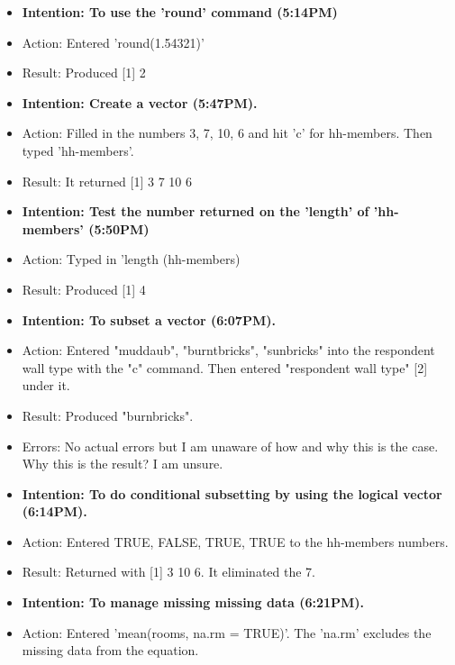 \documentclass[a4paper,12pt]{article}
\begin{document}
\begin{itemize}
\item \textbf{Intention: To use the 'round' command (5:14PM)}


\item Action: Entered 'round(1.54321)'


\item Result: Produced [1] 2


\item \textbf{Intention: Create a vector (5:47PM).}


\item Action: Filled in the numbers 3, 7, 10, 6 and hit 'c' for hh-members. Then typed 'hh-members'.


\item Result: It returned [1] 3 7 10 6


\item \textbf{Intention: Test the number returned on the 'length' of 'hh-members' (5:50PM)}


\item Action: Typed in 'length (hh-members)


\item Result: Produced [1] 4


\item \textbf{Intention: To subset a vector (6:07PM).}


\item Action: Entered "muddaub", "burntbricks", "sunbricks" into the respondent wall type with the "c" command. Then entered "respondent wall type" [2] under it.


\item Result: Produced "burnbricks". 

\item Errors: No actual errors but I am unaware of how and why this is the case. Why this is the result? I am unsure.  


\item \textbf{Intention: To do conditional subsetting by using the logical vector (6:14PM).}


\item Action: Entered TRUE, FALSE, TRUE, TRUE to the hh-members numbers. 


\item Result: Returned with [1] 3 10 6. It eliminated the 7. 


\item \textbf{Intention: To manage missing missing data (6:21PM).}


\item Action: Entered 'mean(rooms, na.rm = TRUE)'. The 'na.rm' excludes the missing data from the equation.



\end{itemize}
\end{document}
